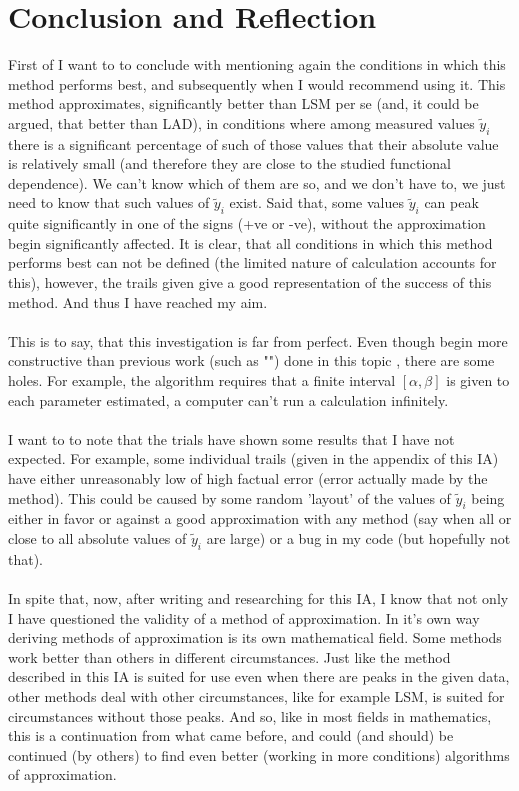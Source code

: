 \section{Conclusion and Reflection}
First of I want to to conclude with mentioning again the conditions in which this method performs best, and subsequently when I would recommend using it. This method approximates, significantly better than LSM per se (and, it could be argued, that better than LAD), in conditions where among measured values $\tilde{y}_{i}$ there is a significant percentage of such of those values that their absolute value is relatively small (and therefore they are close to the studied functional dependence). We can't know which of them are so, and we don't have to, we just need to know that such values of $\tilde{y}_{i}$ exist. Said that, some values $\tilde{y}_{i}$ can peak quite significantly in one of the signs (+ve or -ve), without the approximation begin significantly affected. It is clear, that all conditions in which this method performs best can not be defined (the limited nature of calculation accounts for this), however, the trails given give a good representation of the success of this method.  And thus I have reached my aim. \\
\\
This is to say, that this investigation is far from perfect. Even though begin more constructive than previous work (such as "\cite{balk_2010}") done in this topic , there are some holes. For example, the algorithm requires that a finite interval $[\alpha, \beta]$ is given to each parameter estimated, a computer can't run a calculation infinitely. \\
\\
I want to to note that the trials have shown  some results that I have not expected. For example, some individual trails (given in the appendix of this IA) have either unreasonably low of high factual error (error actually made by the method). This could be caused by some random 'layout' of the values of $\tilde{y}_{i}$ being either in favor or against a good approximation with any method (say when all or close to all absolute values of $\tilde{y}_{i}$ are large) or a bug in my code (but hopefully not that). \\
\\
In spite that, now, after writing and researching for this IA, I know that not only I have questioned the validity of a method of approximation. In it's own way deriving methods of approximation is its own mathematical field. Some methods work better than others in different circumstances. Just like the method described in this IA is suited for use even when there are peaks in the given data, other methods deal with other circumstances, like for example LSM, is suited for circumstances without those peaks. And so, like in most fields in mathematics, this is a continuation from what came before, and could (and should) be continued (by others) to find even better (working in more conditions) algorithms of approximation.



\newpage





